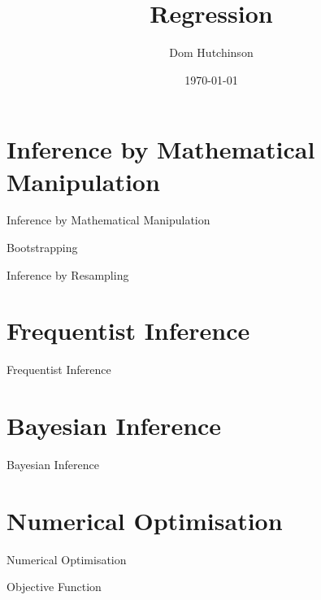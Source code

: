 \documentclass[11pt,a4paper]{article}
\begin{document}
\title{Regression}
\author{Dom Hutchinson}
\date{\today}
\maketitle

\section{Inference by Mathematical Manipulation}

\begin{definition}{Inference by Mathematical Manipulation}

\end{definition}

\begin{definition}{Bootstrapping}
\end{definition}

\begin{definition}{Inference by Resampling}

\end{definition}

\section{Frequentist Inference}

\begin{definition}{Frequentist Inference}

\end{definition}

\section{Bayesian Inference}

\begin{definition}{Bayesian Inference}

\end{definition}

\section{Numerical Optimisation}

\begin{definition}{Numerical Optimisation}

\end{definition}

\begin{definition}{Objective Function}

\end{definition}
\end{document}

